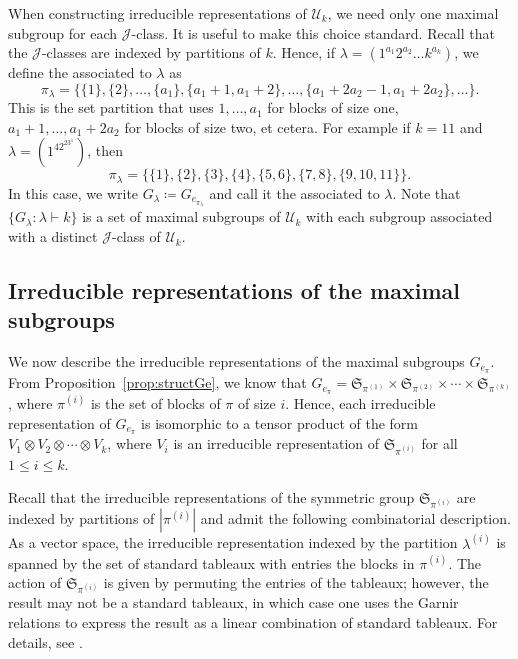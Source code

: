When constructing irreducible representations of $\mathcal{U}_k$, we need only one maximal subgroup for each $\mathscr{J}$-class.
It is useful to make this choice standard.
Recall that the $\mathscr{J}$-classes are indexed by partitions of $k$. Hence, if $\lambda = (1^{a_1}2^{a_2}\ldots k^{a_k})$, we define the
 associated to $\lambda$ as
\begin{equation}
\label{equation.canonical}
    \pi_\lambda = \{\{1\}, \{2\}, \ldots, \{a_1\}, \{a_1+1, a_1+2\}, \ldots, \{a_1+2a_2-1, a_1+2a_2\}, \ldots \}.
\end{equation}
This is the set partition that uses $1, \ldots, a_1$ for blocks of size one, $a_1+1, \ldots, a_1+2a_2$ for blocks of size two, et cetera.
For example if $k=11$ and $\lambda = (1^42^23^1)$, then
\[
    \pi_\lambda = \{\{1\}, \{2\}, \{3\}, \{4\},\{5,6\},\{7,8\},\{9,10,11\}\}.
\]
In this case, we write $G_\lambda \coloneqq G_{e_{\pi_\lambda}}$ and call it the
 associated to $\lambda$.
Note that $\{G_\lambda : \lambda \vdash k\}$ is a set of maximal subgroups of
$\mathcal{U}_k$ with each subgroup associated with a distinct
$\mathscr{J}$-class of $\mathcal{U}_k$.

\subsection{Irreducible representations of the maximal subgroups}
\label{sec:irrepsGe}
We now describe the irreducible representations of the maximal subgroups $G_{e_\pi}$.
From Proposition~\ref{prop:structGe}, we know that
$G_{e_\pi} = \mathfrak{S}_{\pi^{(1)}} \times \mathfrak{S}_{\pi^{(2)}}
\times \cdots \times \mathfrak{S}_{\pi^{(k)}}$,
where $\pi^{(i)}$ is the set of blocks of $\pi$ of size $i$.
Hence, each irreducible representation of $G_{e_\pi}$
is isomorphic to a tensor product of the form
$V_1 \otimes V_2 \otimes \cdots \otimes V_k$,
where $V_i$ is an irreducible representation of $\mathfrak{S}_{\pi^{(i)}}$
for all $1 \leqslant i \leqslant k$.

Recall that the irreducible representations of the symmetric group
$\mathfrak{S}_{\pi^{(i)}}$ are indexed by partitions of $|\pi^{(i)}|$
and admit the following combinatorial description.
As a vector space, the irreducible representation indexed by the partition
$\lambda^{(i)}$ is spanned by the set of standard tableaux with entries the
blocks in $\pi^{(i)}$. The action of $\mathfrak{S}_{\pi^{(i)}}$ is given by
permuting the entries of the tableaux; however, the result may not be
a standard tableaux, in which case one uses the Garnir relations to express the
result as a linear combination of standard tableaux. For details, see
\cite[Chapter~2]{Sagan.2001}.

